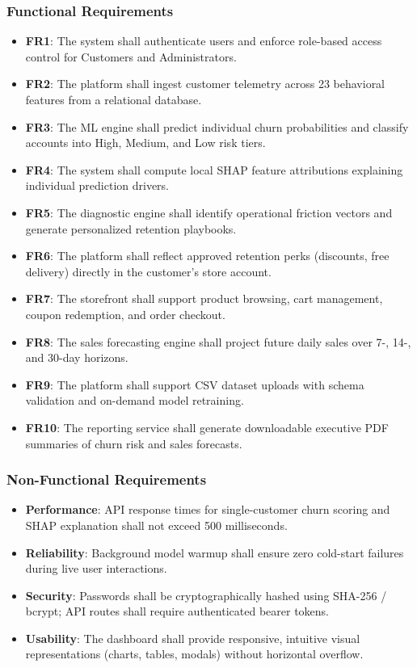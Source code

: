 \documentclass[12pt,a4paper]{article}
\begin{document}
\subsubsection{Functional Requirements}
\begin{itemize}[leftmargin=20pt]
    \item \textbf{FR1}: The system shall authenticate users and enforce role-based access control for Customers and Administrators.
    \item \textbf{FR2}: The platform shall ingest customer telemetry across 23 behavioral features from a relational database.
    \item \textbf{FR3}: The ML engine shall predict individual churn probabilities and classify accounts into High, Medium, and Low risk tiers.
    \item \textbf{FR4}: The system shall compute local SHAP feature attributions explaining individual prediction drivers.
    \item \textbf{FR5}: The diagnostic engine shall identify operational friction vectors and generate personalized retention playbooks.
    \item \textbf{FR6}: The platform shall reflect approved retention perks (discounts, free delivery) directly in the customer's store account.
    \item \textbf{FR7}: The storefront shall support product browsing, cart management, coupon redemption, and order checkout.
    \item \textbf{FR8}: The sales forecasting engine shall project future daily sales over 7-, 14-, and 30-day horizons.
    \item \textbf{FR9}: The platform shall support CSV dataset uploads with schema validation and on-demand model retraining.
    \item \textbf{FR10}: The reporting service shall generate downloadable executive PDF summaries of churn risk and sales forecasts.
\end{itemize}

\subsubsection{Non-Functional Requirements}
\begin{itemize}[leftmargin=20pt]
    \item \textbf{Performance}: API response times for single-customer churn scoring and SHAP explanation shall not exceed 500 milliseconds.
    \item \textbf{Reliability}: Background model warmup shall ensure zero cold-start failures during live user interactions.
    \item \textbf{Security}: Passwords shall be cryptographically hashed using SHA-256 / bcrypt; API routes shall require authenticated bearer tokens.
    \item \textbf{Usability}: The dashboard shall provide responsive, intuitive visual representations (charts, tables, modals) without horizontal overflow.
\end{itemize}
\end{document}
